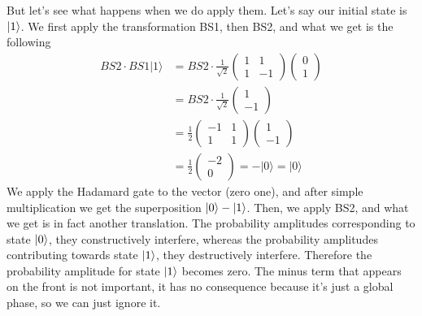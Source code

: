 But let's see what happens when we do apply them. Let's say our initial state is $\left| 1 \right\rangle$. We first apply the transformation BS1, then BS2, and what we get is the following
\begin{equation}
\begin{aligned}
B S 2 \cdot B S 1|1\rangle &=B S 2 \cdot \frac{1}{\sqrt{2}}\left(\begin{array}{cc}
1 & 1 \\
1 & -1
\end{array}\right)\left(\begin{array}{l}
0 \\
1
\end{array}\right) \\
&=B S 2 \cdot \frac{1}{\sqrt{2}}\left(\begin{array}{c}
1 \\
-1
\end{array}\right) \\
&=\frac{1}{2}\left(\begin{array}{cc}
-1 & 1 \\
1 & 1
\end{array}\right)\left(\begin{array}{c}
1 \\
-1
\end{array}\right) \\
&=\frac{1}{2}\left(\begin{array}{c}
-2 \\
0
\end{array}\right)=-|0\rangle=|0\rangle
\end{aligned}
\end{equation}
We apply the Hadamard gate to the vector (zero one), and after simple multiplication we get the superposition $\left| 0 \right\rangle-\left| 1 \right\rangle$. Then, we apply BS2, and what we get is in fact another translation. The probability amplitudes corresponding to state $\left| 0 \right\rangle$, they constructively interfere, whereas the probability amplitudes contributing towards state $\left| 1 \right\rangle$, they destructively interfere. Therefore the probability amplitude for state $\left| 1 \right\rangle$ becomes zero. The minus term that appears on the front is not important, it has no consequence because it's just a global phase, so we can just ignore it.
 
